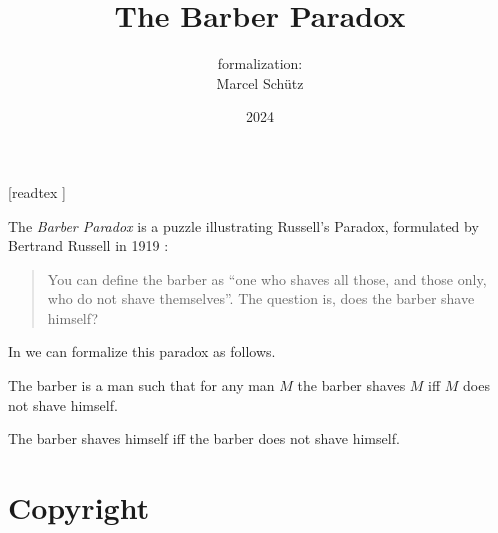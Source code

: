 \documentclass{article}
\title{The Barber Paradox}
\author{\Naproche formalization:\\[0.5em]Marcel Schütz}
\date{2024}
\begin{document}
  \maketitle

  \begin{imports}
    \begin{forthel}
      [readtex ]
    \end{forthel}
  \end{imports}

  \noindent The \emph{Barber Paradox} is a puzzle illustrating Russell's
  Paradox, formulated by Bertrand Russell in 1919 \cite[p. 355]{Russell1919}:

  \begin{quotation}
    \noindent You can define the barber as ``one who shaves all those, and 
    those only, who do not shave themselves''.
    The question is, does the barber shave himself?
  \end{quotation}
  
  \noindent In \Naproche we can formalize this paradox as follows.

  \begin{forthel}
    \begin{signature*}
      The barber is a man such that for any man $M$ the barber shaves $M$ iff $M$ does not shave himself.
    \end{signature*}
    
    \begin{theorem*}\label{barber_paradox}
      The barber shaves himself iff the barber does not shave himself.
    \end{theorem*}
  \end{forthel}

  \printbibliography

  \section*{Copyright}
  \doclicenseThis
\end{document}
